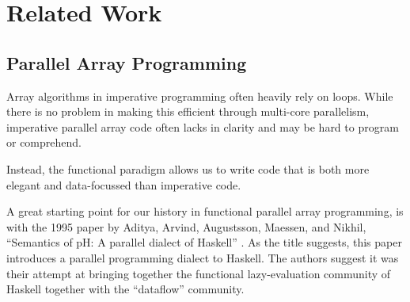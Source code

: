 \section{Related Work}
    \subsection{Parallel Array Programming}
        Array algorithms in imperative programming often heavily rely on loops.
        While there is no problem in making this efficient through multi-core parallelism, imperative parallel array code often lacks in clarity and may be hard to program or comprehend.

        Instead, the functional paradigm allows us to write code that is both more elegant and data-focussed than imperative code.

        A great starting point for our history in functional parallel array programming, is with the 1995 paper by Aditya, Arvind, Augustsson, Maessen, and Nikhil, ``Semantics of pH: A parallel dialect of Haskell'' \cite{maessen1995semantics}.
        As the title suggests, this paper introduces a parallel programming dialect to Haskell.
        The authors suggest it was their attempt at bringing together the functional lazy-evaluation community of Haskell together with the ``dataflow'' community.
        
